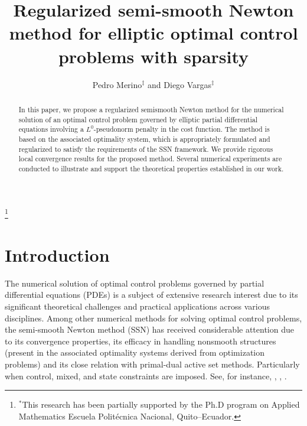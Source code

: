 \documentclass[11pt,a4paper]{amsart}
\begin{document}
\linenumbers
\modulolinenumbers[1]
	\title[Sparse optimal control]{Regularized semi-smooth Newton method for elliptic optimal control problems with sparsity}
	
	\author{Pedro Merino$^\ddag$ and Diego Vargas$^\ddag$}
	\address{$^\ddag$Research Center of Mathematical Modeling (MODEMAT) and Escuela Polit\'ecnica Nacional, Quito, Ecuador}
	\keywords{}
	\thanks{$^*$This research has been partially supported by the  Ph.D program on Applied Mathematics Escuela Polit\'ecnica Nacional, Quito--Ecuador.}
	
	\smallskip
\begin{abstract}
In this paper, we propose a regularized semismooth Newton method for the numerical solution of an optimal control problem governed by elliptic partial differential equations involving a $L^0$-pseudonorm penalty in the cost function. The method is based on the associated optimality system, which is appropriately formulated and regularized to satisfy the requirements of the SSN framework. We provide rigorous local convergence results for the proposed method.  Several numerical experiments are conducted to illustrate and support the theoretical properties established in our work.

\end{abstract}
	
\maketitle 

\section{Introduction}

The numerical solution of optimal control problems governed by partial differential equations (PDEs) is a subject of extensive research interest due to its significant theoretical challenges and practical applications across various disciplines. Among other numerical methods for solving optimal control problems, the semi-smooth Newton method (SSN) has received considerable attention due to its convergence properties, its efficacy in handling nonsmooth structures (present in the associated optimality systems derived from optimization problems) and its close relation with primal-dual active set methods. Particularly when control, mixed, and state constraints are imposed. See, for instance, \cite{ulbrich2002}, \cite{ito2003semi}, \cite{hint02primal}.
\end{document}
